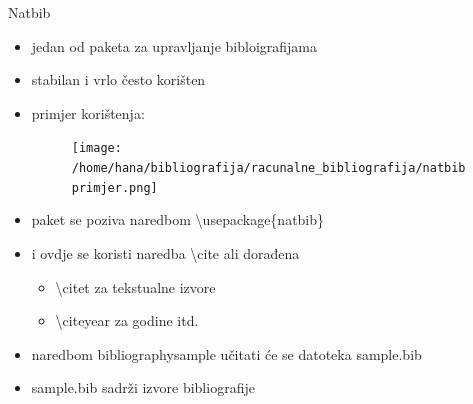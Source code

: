 \documentclass{beamer}
\begin{document}
\begin{frame}{Natbib}
\begin{itemize}
	\item jedan od paketa za upravljanje bibloigrafijama \\
	\item stabilan i vrlo često korišten \\
	\item primjer korištenja: \\ 
	\begin{figure}
	\texttt{[image: /home/hana/bibliografija/racunalne\_bibliografija/natbibprimjer.png]}
	\end{figure}
\end{itemize}
\end{frame}

\begin{frame}
\begin{itemize}
	\item paket se poziva naredbom \textbackslash usepackage\{natbib\}\\
	\item i ovdje se koristi naredba \textbackslash cite ali dorađena\\
	\begin{itemize}
		\item \textbackslash citet za tekstualne izvore \\
		\item \textbackslash citeyear za godine itd. \\
	\end{itemize}  
	\item naredbom \textbacklash bibliography{sample} učitati će se datoteka sample.bib \\
	\item sample.bib sadrži izvore bibliografije \\
\end{itemize}
\end{frame}
\end{document}
